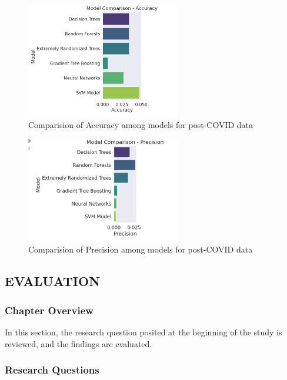 \documentclass[12pt]{article}
\begin{document}
\begin{figure}[ht]
    \centering
    \includegraphics[width = 0.6\textwidth]{Figures/Post_covid_Accuracy.png}
    \caption{Comparision of Accuracy among models for post-COVID data}
    \label{fig:Comparision of Accuracy among models for post-COVID data}
\end{figure}

\bigbreak

\begin{figure}[ht]
    \centering
    \includegraphics[width = 0.6\textwidth]{Figures/Post_covid_precision.png}
    \caption{Comparision of Precision among models for post-COVID data}
    \label{fig:Comparision of Precision among models for post-COVID data}
\end{figure}

\newpage
\subsection{EVALUATION}

\subsubsection{Chapter Overview}
In this section, the research question posited at the beginning of the study is reviewed, and the findings are evaluated.

\subsubsection{Research Questions}
\end{document}
